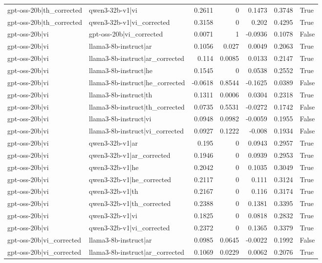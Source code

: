 \begin{table}
\begin{tabular}{l l r r r r l}
gpt-oss-20b|th_corrected & qwen3-32b-v1|vi & 0.2611 & 0 & 0.1473 & 0.3748 & True \\
gpt-oss-20b|th_corrected & qwen3-32b-v1|vi_corrected & 0.3158 & 0 & 0.202 & 0.4295 & True \\
gpt-oss-20b|vi & gpt-oss-20b|vi_corrected & 0.0071 & 1 & -0.0936 & 0.1078 & False \\
gpt-oss-20b|vi & llama3-8b-instruct|ar & 0.1056 & 0.027 & 0.0049 & 0.2063 & True \\
gpt-oss-20b|vi & llama3-8b-instruct|ar_corrected & 0.114 & 0.0085 & 0.0133 & 0.2147 & True \\
gpt-oss-20b|vi & llama3-8b-instruct|he & 0.1545 & 0 & 0.0538 & 0.2552 & True \\
gpt-oss-20b|vi & llama3-8b-instruct|he_corrected & -0.0618 & 0.8544 & -0.1625 & 0.0389 & False \\
gpt-oss-20b|vi & llama3-8b-instruct|th & 0.1311 & 0.0006 & 0.0304 & 0.2318 & True \\
gpt-oss-20b|vi & llama3-8b-instruct|th_corrected & 0.0735 & 0.5531 & -0.0272 & 0.1742 & False \\
gpt-oss-20b|vi & llama3-8b-instruct|vi & 0.0948 & 0.0982 & -0.0059 & 0.1955 & False \\
gpt-oss-20b|vi & llama3-8b-instruct|vi_corrected & 0.0927 & 0.1222 & -0.008 & 0.1934 & False \\
gpt-oss-20b|vi & qwen3-32b-v1|ar & 0.195 & 0 & 0.0943 & 0.2957 & True \\
gpt-oss-20b|vi & qwen3-32b-v1|ar_corrected & 0.1946 & 0 & 0.0939 & 0.2953 & True \\
gpt-oss-20b|vi & qwen3-32b-v1|he & 0.2042 & 0 & 0.1035 & 0.3049 & True \\
gpt-oss-20b|vi & qwen3-32b-v1|he_corrected & 0.2117 & 0 & 0.111 & 0.3124 & True \\
gpt-oss-20b|vi & qwen3-32b-v1|th & 0.2167 & 0 & 0.116 & 0.3174 & True \\
gpt-oss-20b|vi & qwen3-32b-v1|th_corrected & 0.2388 & 0 & 0.1381 & 0.3395 & True \\
gpt-oss-20b|vi & qwen3-32b-v1|vi & 0.1825 & 0 & 0.0818 & 0.2832 & True \\
gpt-oss-20b|vi & qwen3-32b-v1|vi_corrected & 0.2372 & 0 & 0.1365 & 0.3379 & True \\
gpt-oss-20b|vi_corrected & llama3-8b-instruct|ar & 0.0985 & 0.0645 & -0.0022 & 0.1992 & False \\
gpt-oss-20b|vi_corrected & llama3-8b-instruct|ar_corrected & 0.1069 & 0.0229 & 0.0062 & 0.2076 & True \\

\end{tabular}
\end{table}
